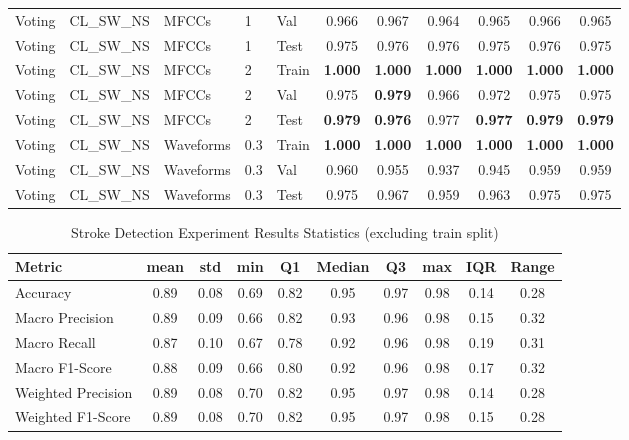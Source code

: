 \begin{landscape}
\begin{longtable}{|l|l|l|l|l|c|c|c|c|c|c|}
Voting & CL\_SW\_NS & MFCCs & 1 & Val & 0.966 & 0.967 & 0.964 & 0.965 & 0.966 & 0.965 \\
Voting & CL\_SW\_NS & MFCCs & 1 & Test & 0.975 & 0.976 & 0.976 & 0.975 & 0.976 & 0.975 \\
Voting & CL\_SW\_NS & MFCCs & 2 & Train & \textbf{1.000} & \textbf{1.000} & \textbf{1.000} & \textbf{1.000} & \textbf{1.000} & \textbf{1.000} \\
Voting & CL\_SW\_NS & MFCCs & 2 & Val & 0.975 & \textbf{0.979} & 0.966 & 0.972 & 0.975 & 0.975 \\
Voting & CL\_SW\_NS & MFCCs & 2 & Test & \textbf{0.979} & \textbf{0.976} & 0.977 & \textbf{0.977} & \textbf{0.979} & \textbf{0.979} \\
Voting & CL\_SW\_NS & Waveforms & 0.3 & Train & \textbf{1.000} & \textbf{1.000} & \textbf{1.000} & \textbf{1.000} & \textbf{1.000} & \textbf{1.000} \\
Voting & CL\_SW\_NS & Waveforms & 0.3 & Val & 0.960 & 0.955 & 0.937 & 0.945 & 0.959 & 0.959 \\
Voting & CL\_SW\_NS & Waveforms & 0.3 & Test & 0.975 & 0.967 & 0.959 & 0.963 & 0.975 & 0.975 \\
\end{longtable}
\end{landscape}

\begin{table}[h]
\caption{Stroke Detection Experiment Results Statistics (excluding train split)}
\label{tab:Stroke_Detection_Results_Statistics}
\begin{tabular}{|l|c|c|c|c|c|c|c|c|c|}
\toprule
Metric & mean & std & min & Q1 & Median & Q3 & max & IQR & Range \\
\midrule
Accuracy & 0.89 & 0.08 & 0.69 & 0.82 & 0.95 & 0.97 & 0.98 & 0.14 & 0.28 \\
Macro Precision & 0.89 & 0.09 & 0.66 & 0.82 & 0.93 & 0.96 & 0.98 & 0.15 & 0.32 \\
Macro Recall & 0.87 & 0.10 & 0.67 & 0.78 & 0.92 & 0.96 & 0.98 & 0.19 & 0.31 \\
Macro F1-Score & 0.88 & 0.09 & 0.66 & 0.80 & 0.92 & 0.96 & 0.98 & 0.17 & 0.32 \\
Weighted Precision & 0.89 & 0.08 & 0.70 & 0.82 & 0.95 & 0.97 & 0.98 & 0.14 & 0.28 \\
Weighted F1-Score & 0.89 & 0.08 & 0.70 & 0.82 & 0.95 & 0.97 & 0.98 & 0.15 & 0.28 \\
\bottomrule
\end{tabular}
\end{table}
